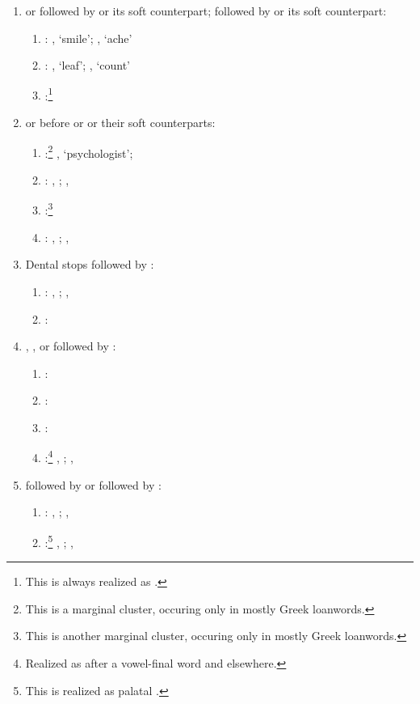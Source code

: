 \begin{enumerate}
\begin{enumerate}
		\end{enumerate}
	\item {} or  followed by  or its soft counterpart;  followed by  or its soft counterpart:
		\begin{enumerate}
			\item {}:  , `smile';  , `ache'
			\item {}:  , `leaf';  , `count'
			\item {}:\footnote{This is always realized as .}
		\end{enumerate}
	\item {} or  before  or  or their soft counterparts:
	\begin{enumerate}
		\item {}:\footnote{This is a marginal cluster, occuring only in mostly Greek loanwords.}  , `psychologist';
		\item {}:  , ;  , 
		\item {}:\footnote{This is another marginal cluster, occuring only in mostly Greek loanwords.}
		\item {}:  , ;  , 
	\end{enumerate}
	\item Dental stops followed by :
	\begin{enumerate}
		\item {}:  , ;  , 
		\item {}:
	\end{enumerate}
		\item {}, ,  or   followed by :
	\begin{enumerate}
		\item {}:
		\item {}:
		\item {}:
		\item {}:\footnote{Realized as  after a vowel-final word and  elsewhere.}  , ;  , 
	\end{enumerate}

		\item {} followed by \bt{n} or  followed by :
	\begin{enumerate}
		\item {}:  , ;  , 
		\item {}:\footnote{This is realized as palatal .}  , ;  , 
	\end{enumerate}


\end{enumerate}
